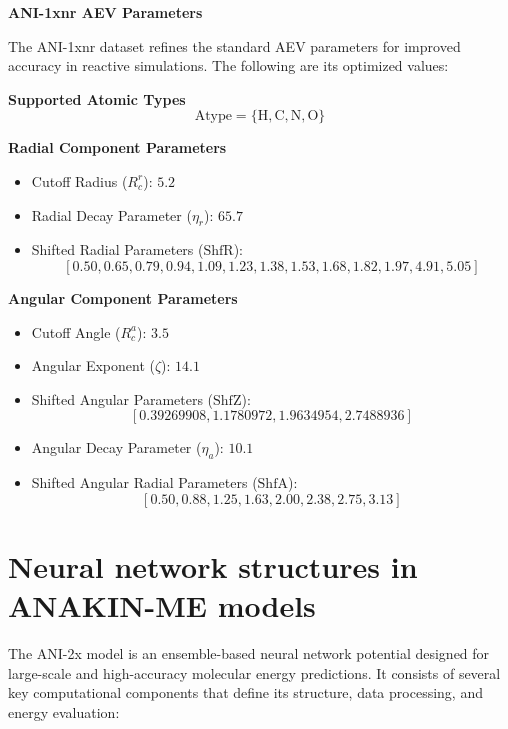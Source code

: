 \bigskip
\bigskip

\begin{center}
\textbf{ANI-1xnr AEV Parameters}
\end{center}
The ANI-1xnr dataset refines the standard AEV parameters for improved accuracy in reactive simulations. The following are its optimized values:

\textbf{Supported Atomic Types}
\begin{equation}
\text{Atype} = \{ \text{H}, \text{C}, \text{N}, \text{O} \}
\end{equation}

\textbf{Radial Component Parameters}
\begin{itemize}
    \item Cutoff Radius (\( R_c^r \)): \( 5.2 \) \angstrom
    \item Radial Decay Parameter (\( \eta_r \)): \( 65.7 \)
    \item Shifted Radial Parameters (\( \text{ShfR} \)):  
    \begin{equation}
    \left[ 0.50, 0.65, 0.79, 0.94, 1.09, 1.23, 1.38, 1.53, 1.68, 1.82, 1.97, 4.91, 5.05 \right]
    \end{equation}
\end{itemize}

\textbf{Angular Component Parameters}
\begin{itemize}
    \item Cutoff Angle (\( R_c^a \)): \( 3.5 \) \angstrom
    \item Angular Exponent (\( \zeta \)): \( 14.1 \)
    \item Shifted Angular Parameters (\( \text{ShfZ} \)):  
    \begin{equation}
    \left[ 0.39269908, 1.1780972, 1.9634954, 2.7488936 \right]
    \end{equation}
    \item Angular Decay Parameter (\( \eta_a \)): \( 10.1 \)
    \item Shifted Angular Radial Parameters (\( \text{ShfA} \)):  
    \begin{equation}
    \left[ 0.50, 0.88, 1.25, 1.63, 2.00, 2.38, 2.75, 3.13 \right]
    \end{equation}
\end{itemize}



\chapter{Neural network structures in ANAKIN-ME models}
\label{appendix:NN_arch}
The ANI-2x model is an ensemble-based neural network potential designed for large-scale and high-accuracy molecular energy predictions. It consists of several key computational components that define its structure, data processing, and energy evaluation:

